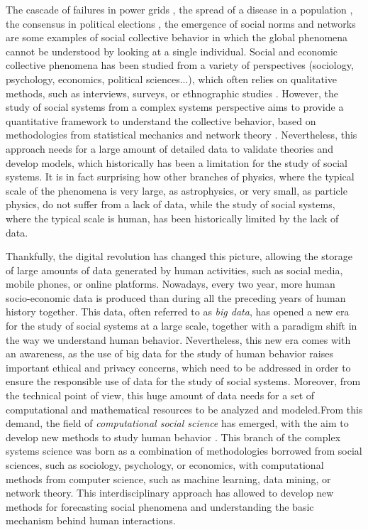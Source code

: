 The cascade of failures in power grids \cite{}, the spread of a disease in a population \cite{anderson1991infectious}, the consensus in political elections \cite{}, the emergence of social norms \cite{} and networks \cite{} are some examples of social collective behavior in which the global phenomena cannot be understood by looking at a single individual. Social and economic collective phenomena has been studied from a variety of perspectives (sociology, psychology, economics, political sciences...), which often relies on qualitative methods, such as interviews, surveys, or ethnographic studies \cite{}. However, the study of social systems from a complex systems perspective aims to provide a quantitative framework to understand the collective behavior, based on methodologies from statistical mechanics and network theory \cite{}. Nevertheless, this approach needs for a large amount of detailed data to validate theories and develop models, which historically has been a limitation for the study of social systems. It is in fact surprising how other branches of physics, where the typical scale of the phenomena is very large, as astrophysics, or very small, as particle physics, do not suffer from a lack of data, while the study of social systems, where the typical scale is human, has been historically limited by the lack of data.

Thankfully, the digital revolution has changed this picture, allowing the storage of large amounts of data generated by human activities, such as social media, mobile phones, or online platforms. Nowadays, every two year, more human socio-economic data is produced than during all the preceding years of human history together. This data, often referred to as \textit{big data}, has opened a new era for the study of social systems at a large scale, together with a paradigm shift in the way we understand human behavior. Nevertheless, this new era comes with an awareness, as the use of big data for the study of human behavior raises important ethical and privacy concerns, which need to be addressed in order to ensure the responsible use of data for the study of social systems. Moreover, from the technical point of view, this huge amount of data needs for a set of computational and mathematical resources to be analyzed and modeled.From this demand, the field of \textit{computational social science} has emerged, with the aim to develop new methods to study human behavior \cite{}. This branch of the complex systems science was born as a combination of methodologies borrowed from social sciences, such as sociology, psychology, or economics, with computational methods from computer science, such as machine learning, data mining, or network theory. This interdisciplinary approach has allowed to develop new methods for forecasting social phenomena and understanding the basic mechanism behind human interactions. 

